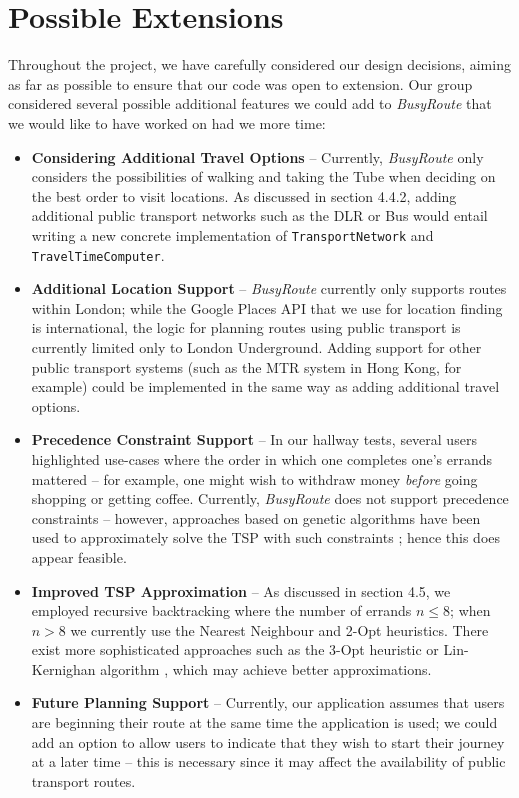 \documentclass[a4paper, 10pt]{report}
\begin{document}
\section{Possible Extensions}
Throughout the project, we have carefully considered our design decisions, aiming as far as possible to ensure that our code was open to extension. 
Our group considered several possible additional features we could add to \textit{BusyRoute} that we would like to have worked on had we more time:
\begin{itemize}
\item \textbf{Considering Additional Travel Options} -- Currently, \textit{BusyRoute} only considers the possibilities of walking and taking the Tube when deciding on the best order to visit locations. As discussed in section 4.4.2, adding additional public transport networks such as the DLR or Bus would entail writing a new concrete implementation of \texttt{TransportNetwork} and \texttt{TravelTimeComputer}. 
\item \textbf{Additional Location Support} -- \textit{BusyRoute} currently only supports routes within London; while the Google Places API that we use for location finding is international, the logic for planning routes using public transport is currently limited only to London Underground. Adding support for other public transport systems (such as the MTR system in Hong Kong, for example) could be implemented in the same way as adding additional travel options.
\item \textbf{Precedence Constraint Support} -- In our hallway tests, several users highlighted use-cases where the order in which one completes one's errands mattered -- for example, one might wish to withdraw money \textit{before} going shopping or getting coffee. Currently, \textit{BusyRoute} does not support precedence constraints -- however, approaches based on genetic algorithms have been used to approximately solve the TSP with such constraints \cite{ga-tsp}; hence this does appear feasible.
\item \textbf{Improved TSP Approximation} -- As discussed in section 4.5, we employed recursive backtracking where the number of errands $n \leq 8$; when $n > 8$ we currently use the Nearest Neighbour and 2-Opt heuristics. There exist more sophisticated approaches such as the 3-Opt heuristic or Lin-Kernighan algorithm \cite{tsp-heuristics}, which may achieve better approximations.
\item \textbf{Future Planning Support} -- Currently, our application assumes that users are beginning their route at the same time the application is used; we could add an option to allow users to indicate that they wish to start their journey at a later time -- this is necessary since it may affect the availability of public transport routes.
\end{itemize}
\end{document}
